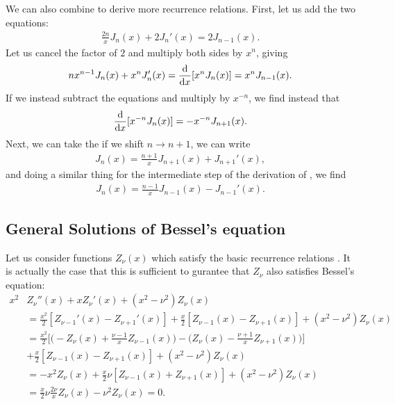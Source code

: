 We can also combine  to derive more recurrence relations.
First, let us add the two equations:
\begin{eqnarray}
    \label{eq:intermediate-rec-rel}
    \frac{2n}{x} J_{n}(x) + 2 J_{n}'(x) = 2J_{n-1}(x)
.\end{eqnarray}
Let us cancel the factor of $2$ and multiply both sides by $x^{n}$, giving
\begin{eqnarray}
    nx^{n-1} J_{n}(x) + x^{n} J_{n}'(x) = \dv{x} [ x^{n} J_{n}(x) ] = x^{n} J_{n-1}(x)
.\end{eqnarray}
If we instead subtract the equations and multiply by $x^{-n}$, we find instead that
\begin{eqnarray}
    \label{eq:derivative-rec-rel-2}
    \dv{x} [ x^{-n} J_{n}(x) ] = - x^{-n} J_{n+1}(x)
.\end{eqnarray}
Next, we can take the if we shift $n \rightarrow n + 1$, we can write 
\begin{align}
    J_{n}(x) = \frac{n+1}{x} J_{n+1}(x) + J_{n+1}'(x)
,\end{align}
and doing a similar thing for the intermediate step of the derivation of , we find
\begin{eqnarray}
    J_{n}(x) = \frac{n-1}{x} J_{n-1}(x) - J_{n-1}'(x)
.\end{eqnarray}

\subsection{General Solutions of Bessel's equation}

Let us consider functions $Z_{\nu}(x)$ which satisfy the basic recurrence relations .
It is actually the case that this is sufficient to gurantee that $Z_{\nu}$ also satisfies Bessel's equation:
\begin{align}
    x^2 &Z_{\nu}''(x) + x Z_{\nu}'(x) + (x^2 - \nu^2) Z_{\nu}(x) \nonumber \\
        &= \frac{x^2}{2} [ Z_{\nu-1}'(x) - Z_{\nu+1}'(x) ] + \frac{x}{2}[ Z_{\nu-1}(x) - Z_{\nu+1}(x) ] + (x^2 - \nu^2) Z_{\nu}(x) \nonumber \\
        &= \frac{x^2}{2} \Big[ \Big( -Z_{\nu}(x) + \frac{\nu - 1}{x} Z_{\nu-1}(x) \Big) - \Big( Z_{\nu}(x) - \frac{\nu+1}{x} Z_{\nu+1}(x) \Big) \Big] \nonumber \\
        &+ \frac{x}{2} [ Z_{\nu-1}(x) - Z_{\nu+1}(x) ] + (x^2 - \nu^2) Z_{\nu}(x) \nonumber \\
        &= -x^2 Z_{\nu}(x) + \frac{x}{2} \nu [ Z_{\nu-1}(x) + Z_{\nu+1}(x) ] + (x^2 - \nu^2) Z_{\nu}(x) \nonumber \\
        &= \frac{x}{2} \nu \frac{2\nu}{x} Z_{\nu}(x) - \nu^2 Z_{\nu}(x) = 0
.\end{align}

